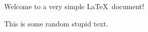 \documentclass[12pt]{article}
\begin{document}
Welcome to a very simple \LaTeX~document!

This is some random stupid text.
\end{document}
